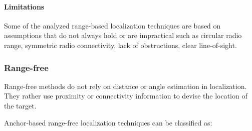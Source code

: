\documentclass[a4paper,12pt]{article}
\begin{document}
\paragraph{Limitations}
Some of the analyzed range-based localization techniques are based on assumptions that do not always hold or are impractical such as circular radio range, symmetric radio connectivity, lack of obstructions, clear line-of-sight.

\subsubsection{Range-free}
Range-free methods do not rely on distance or angle estimation in localization. They rather use proximity or connectivity information to devise the location of the target.

Anchor-based range-free localization techniques can be classified as:
\end{document}
